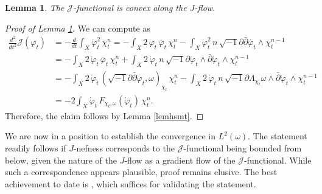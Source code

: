 \documentclass{amsart}
\numberwithin{equation}{section}
\theoremstyle{plain}
\newtheorem{lem}[equation]{Lemma}
\theoremstyle{definition}
\theoremstyle{remark}
\newcommand{\delb}{\sqrt{-1}\partial\bar{\partial}}
\begin{document}
\begin{lem}\label{lemconvexity}
    The $\mathcal{J}$-functional is convex along the $J$-flow.
\end{lem}
\begin{proof}[Proof of Lemma \ref{lemconvexity}] We can compute as
    \begin{align*}
        \frac{d^2}{dt^2}\mathcal{J}(\varphi_t)
        &= - \frac{d}{dt} \int_X \dot{\varphi}_t^2 \, \chi_t^n
        = - \int_X 2 \, \dot{\varphi}_t \, \ddot{\varphi_t} \, \chi^n_t 
          - \int_X \dot{\varphi}_t^2 \, n \, \delb \dot{\varphi_t}  \wedge \chi^{n-1}_t \\
        &= - \int_X 2 \, \dot{\varphi}_t \, \ddot{\varphi_t} \, \chi^n_t 
           + \int_X 2 \, \dot{\varphi}_t \, n \, \sqrt{-1} \partial \dot{\varphi}_t\wedge \bar{\partial} \dot{\varphi}_t \wedge \chi^{n-1}_t \\
        &= - \int_X 2\, \dot{\varphi}_t \, (\delb \dot{\varphi}_t, \omega)_{\chi_t} \, \chi^n_t
           - \int_X 2 \, \dot{\varphi}_t \, n \, \sqrt{-1} \partial \Lambda_{\chi_t} \omega \wedge \bar{\partial} \dot{\varphi}_t \wedge \chi^{n-1}_t \\
        &= -2 \int_X \dot{\varphi}_t \, F_{\chi_t,\omega}(\dot{\varphi}_t) \, \chi^n_t.
    \end{align*}
    Therefore, the claim follows by Lemma \ref{lemhsmt}.
\end{proof}

We are now in a position to establish the convergence in $L^2(\omega)$. The statement readily follows if $J$-nefness corresponds to the $\mathcal{J}$-functional being bounded from below, given the nature of the $J$-flow as a gradient flow of the $\mathcal{J}$-functional. While such a correspondence appears plausible, proof remains elusive. The best achievement to date is \cite[Theorem 23]{SD}, which suffices for validating the statement.
\end{document}
